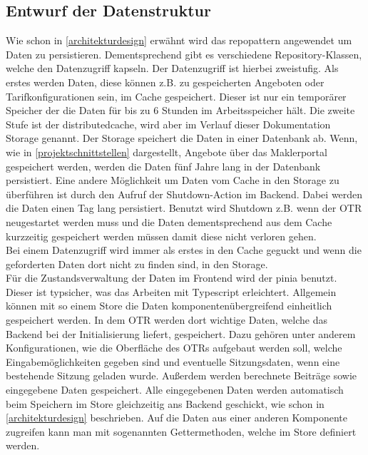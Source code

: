 \subsection{Entwurf der Datenstruktur}
\label{datenmodell}
Wie schon in \ref{architekturdesign} erwähnt wird das \gls{repopattern} angewendet um Daten zu persistieren. Dementsprechend gibt es verschiedene Repository-Klassen, welche den Datenzugriff kapseln. Der Datenzugriff ist hierbei zweistufig. Als erstes werden Daten, diese können z.B. zu gespeicherten Angeboten oder Tarifkonfigurationen sein, im Cache gespeichert. Dieser ist nur ein temporärer Speicher der die Daten für bis zu 6 Stunden im Arbeitsspeicher hält. Die zweite Stufe ist der \gls{distributedcache}, wird aber im Verlauf dieser Dokumentation Storage genannt. Der Storage speichert die Daten in einer Datenbank ab.
Wenn, wie in \ref{projektschnittstellen} dargestellt, Angebote über das Maklerportal gespeichert werden, werden die Daten fünf Jahre lang in der Datenbank persistiert. Eine andere Möglichkeit um Daten vom Cache in den Storage zu überführen ist durch den Aufruf der Shutdown-Action im Backend. Dabei werden die Daten einen Tag lang persistiert. Benutzt wird Shutdown z.B. wenn der \ac{OTR} neugestartet werden muss und die Daten dementsprechend aus dem Cache kurzzeitig gespeichert werden müssen damit diese nicht verloren gehen.\\
Bei einem Datenzugriff wird immer als erstes in den Cache geguckt und wenn die geforderten Daten dort nicht zu finden sind, in den Storage.\\
Für die Zustandsverwaltung der Daten im Frontend wird der \gls{pinia} benutzt. Dieser ist typsicher, was das Arbeiten mit Typescript erleichtert. Allgemein können mit so einem Store die Daten komponentenübergreifend einheitlich gespeichert werden. In dem \ac{OTR} werden dort wichtige Daten, welche das Backend bei der Initialisierung liefert, gespeichert. Dazu gehören unter anderem Konfigurationen, wie die Oberfläche des \ac{OTR}s aufgebaut werden soll, welche Eingabemöglichkeiten gegeben sind und eventuelle Sitzungsdaten, wenn eine bestehende Sitzung geladen wurde. Außerdem werden berechnete Beiträge sowie eingegebene Daten gespeichert. Alle eingegebenen Daten werden automatisch beim Speichern im Store gleichzeitig ans Backend geschickt, wie schon in \ref{architekturdesign} beschrieben. Auf die Daten aus einer anderen Komponente zugreifen kann man mit sogenannten Gettermethoden, welche im Store definiert werden.
